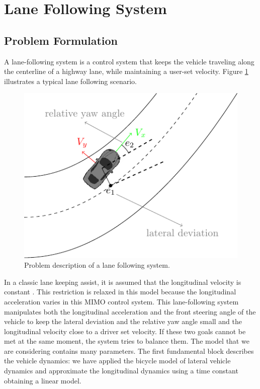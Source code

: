 \documentclass[conference,11pt]{IEEEtran}
\begin{document}
\section{Lane Following System}
\subsection{Problem Formulation}
A lane-following system is a control system that keeps the vehicle traveling along the centerline of a highway lane, while maintaining a user-set velocity. Figure \ref{fig:laneFollowing} illustrates a typical lane following scenario.
\begin{figure}[!h]
	\centering
	\includegraphics[width=0.75\columnwidth]{./figure/laneFollowing/laneFollowing.pdf}
	\caption{Problem description of a lane following system.}
	\label{fig:laneFollowing}
\end{figure}
In a classic lane keeping assist, it is assumed that the longitudinal velocity is constant \cite{borelli3}. This restriction is relaxed in this model because the longitudinal acceleration varies in this MIMO control system. This lane-following system manipulates both the longitudinal acceleration and the front steering angle of the vehicle to keep the lateral deviation and the relative yaw angle small and the longitudinal velocity close to a driver set velocity. If these two goals cannot be met at the same moment, the system tries to balance them. The model that we are considering contains many parameters. The first fundamental block describes the vehicle dynamics: we have applied the bicycle model of lateral vehicle dynamics and approximate the longitudinal dynamics using a time constant obtaining  a linear model.
\end{document}
